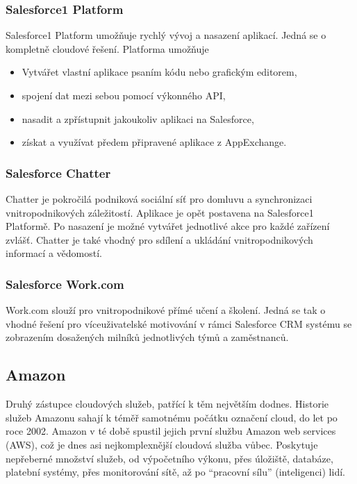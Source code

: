 \subsubsection{Salesforce1 Platform}
Salesforce1 Platform umožňuje rychlý vývoj a nasazení aplikací. Jedná se o kompletně cloudové řešení.\nocite{salesforce:platform} Platforma umožňuje
	\begin{itemize}
		\item Vytvářet vlastní aplikace psaním kódu nebo grafickým editorem,
		\item spojení dat mezi sebou pomocí výkonného API,
		\item nasadit a zpřístupnit jakoukoliv aplikaci na Salesforce,
		\item získat a využívat předem připravené aplikace z AppExchange.
	\end{itemize}

\subsubsection{Salesforce Chatter}
Chatter je pokročilá podniková sociální síť pro domluvu a synchronizaci vnitropodnikových záležitostí. Aplikace je opět postavena na Salesforce1 Platformě. Po nasazení je možné vytvářet jednotlivé akce pro každé zařízení zvlášť. Chatter je také vhodný pro sdílení a ukládání vnitropodnikových informací a vědomostí.\nocite{salesforce:chatter}

\subsubsection{Salesforce Work.com}
Work.com slouží pro vnitropodnikové přímé učení a školení. Jedná se tak o vhodné řešení pro víceuživatelské motivování v rámci Salesforce CRM systému se zobrazením dosažených milníků jednotlivých týmů a zaměstnanců.\nocite{salesforce:work}

\subsection{Amazon}
Druhý zástupce cloudových služeb, patřící k těm největším dodnes. Historie služeb Amazonu sahají k téměř samotnému počátku označení cloud, do let po roce 2002. Amazon v té době spustil jejich první službu Amazon web services (AWS), což je dnes asi nejkomplexnější cloudová služba vůbec. Poskytuje nepřeberné množství služeb, od výpočetního výkonu, přes úložiště, databáze, platební systémy, přes monitorování sítě, až po "`pracovní sílu"' (inteligenci) lidí.

